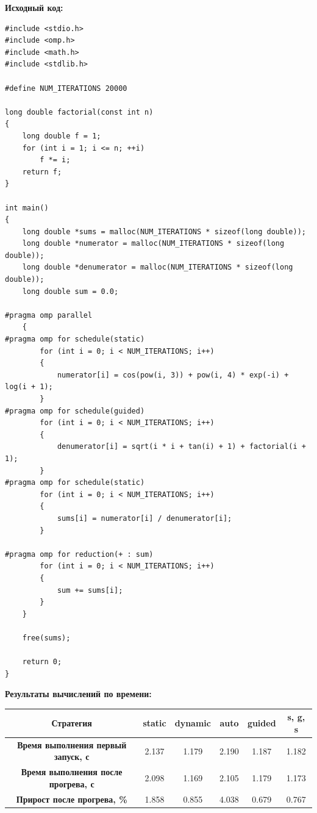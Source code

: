 \documentclass[a4paper,14pt]{extarticle}
\begin{document}
\textbf{Исходный код:}
\begin{verbatim}
#include <stdio.h>
#include <omp.h>
#include <math.h>
#include <stdlib.h>

#define NUM_ITERATIONS 20000

long double factorial(const int n)
{
    long double f = 1;
    for (int i = 1; i <= n; ++i)
        f *= i;
    return f;
}

int main()
{
    long double *sums = malloc(NUM_ITERATIONS * sizeof(long double));
    long double *numerator = malloc(NUM_ITERATIONS * sizeof(long double));
    long double *denumerator = malloc(NUM_ITERATIONS * sizeof(long double));
    long double sum = 0.0;

#pragma omp parallel
    {
#pragma omp for schedule(static)
        for (int i = 0; i < NUM_ITERATIONS; i++)
        {
            numerator[i] = cos(pow(i, 3)) + pow(i, 4) * exp(-i) + log(i + 1);
        }
#pragma omp for schedule(guided)
        for (int i = 0; i < NUM_ITERATIONS; i++)
        {
            denumerator[i] = sqrt(i * i + tan(i) + 1) + factorial(i + 1);
        }
#pragma omp for schedule(static)
        for (int i = 0; i < NUM_ITERATIONS; i++)
        {
            sums[i] = numerator[i] / denumerator[i];
        }

#pragma omp for reduction(+ : sum)
        for (int i = 0; i < NUM_ITERATIONS; i++)
        {
            sum += sums[i];
        }
    }

    free(sums);

    return 0;
}
\end{verbatim}

\textbf{Результаты вычислений по времени:}\\
\begin{tabular}{|c|c|c|c|c|c|}
    \hline
    \textbf{Стратегия}                          & static & dynamic & auto  & guided & s, g, s \\ 
    \hline
    \textbf{Время выполнения первый запуск, с}  & 2.137  & 1.179   & 2.190 & 1.187  & 1.182\\
    \hline
    \textbf{Время выполнения после прогрева, с} & 2.098  & 1.169   & 2.105 & 1.179  & 1.173\\
    \hline
    \textbf{Прирост после прогрева, \%}         & 1.858  & 0.855   & 4.038 & 0.679  & 0.767\\
    \hline
\end{tabular}\\
\end{document}
